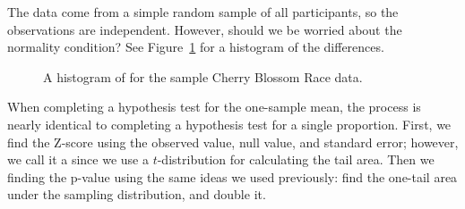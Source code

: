 \begin{exercisewrap}
\begin{nexercise}
The data come from a simple random sample of all participants,
so the observations are independent.
However, should we be worried about the normality condition?
See Figure~\ref{run10SampTimeHistogram} for a histogram
of the differences.\footnotemark{}
\end{nexercise}
\end{exercisewrap}

\begin{figure}[h]
  \centering
  \caption{A histogram of  for the sample
      Cherry Blossom Race data.}
  \label{run10SampTimeHistogram}
\end{figure}

When completing a hypothesis test for the one-sample mean,
the process is nearly identical to completing a hypothesis
test for a single proportion.
First, we find the Z-score using the observed value,
null value, and standard error;
however, we call it a  since we use
a $t$-distribution for calculating the tail area.
Then we finding the p-value using the same ideas we used
previously: find the one-tail area under the sampling
distribution, and double it.


